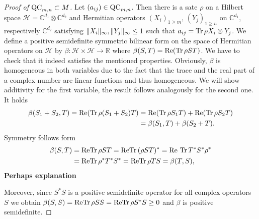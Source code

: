 \begin{proof}[Proof of $ \textup{QC}_{m,n} \subset M $]
	Let $ (a_{ij}) \in \textup{QC}_{m,n} $. Then there is a sate $ \rho $ on a Hilbert space $ \mathcal{H} = \mathbb{C}^{d_1} \otimes\mathbb{C}^{d_2} $ and Hermitian operators $ (X_i)_{1 \ge m}, \, (Y_j)_{1 \ge n} $ on $ \mathbb{C}^{d_1} $, respectively $ \mathbb{C}^{d_2} $ satisfying $  \Vert {X_i} \Vert_{\infty},  \Vert {Y_j} \Vert_{\infty} \le 1 $ such that 
	$ a_{ij} = \text{Tr} \, {\rho X_i \otimes Y_j}  $.
	We define a positive semidefinite symmetric bilinear form on the space of Hermitian operators on $ \mathcal{H} $ by 
	$ \beta: \mathcal{H} \times \mathcal{H} \to \mathbb{R} $ where $ \beta(S,T) =\textup{Re}( \text{Tr} \, {\rho ST} ) $.
	We have to check that it indeed satisfies the mentioned properties. 
	Obviously, $ \beta $ is homogeneous in both variables due to the fact that the trace and the real part of a complex number are linear functions and thus homogeneous. We will show additivity for the first variable, the result follows analogously for the second one. It holds
	\begin{align*}
		\beta(S_1+S_2,T) = \textup{Re}(\text{Tr} \, {\rho(S_1+S_2)T} ) &= \textup{Re}(\text{Tr} \, {\rho S_1T} ) + \textup{Re}(\text{Tr} \, {\rho S_2T} ) \\
		&= \beta(S_1,T)+ \beta(S_2+T).
	\end{align*}
	Symmetry follows form 
	\begin{align*}
		\beta(S,T)&= \textup{Re}\text{Tr} \, {\rho ST}  =\textup{Re}\text{Tr} \, {(\rho ST)^*}   = \textup{Re \ensuremath{\text{Tr} \, {T^*S^* \rho^*} }}  \\
		 &=\textup{Re} \text{Tr} \, {\rho^* T^*S^*}  = \textup{Re} \text{Tr} \, {\rho T S}  = \beta(T,S),
	\end{align*}
	\textbf{Perhaps explanation}
	
	Moreover, since $ S^*S $ is a positive semidefinite operator for all complex operators $ S $ we obtain $ \beta(S,S) = \textup{Re}\text{Tr} \, {\rho SS}  = \textup{Re} \text{Tr} \, {\rho S^*S}  \ge 0 $ and $ \beta $ is positive semidefinite. 
	

\end{proof}

